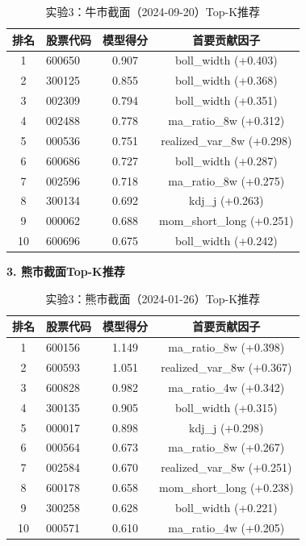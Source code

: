 \documentclass[11pt,a4paper]{ctexart}
\begin{document}
\begin{table}[htbp]
\centering
\caption{实验3：牛市截面（2024-09-20）Top-K推荐}
\label{tab:exp3-bull}
\begin{tabular}{clcc}
\toprule
\textbf{排名} & \textbf{股票代码} & \textbf{模型得分} & \textbf{首要贡献因子} \\
\midrule
1  & 600650 & 0.907 & boll\_width (+0.403) \\
2  & 300125 & 0.855 & boll\_width (+0.368) \\
3  & 002309 & 0.794 & boll\_width (+0.351) \\
4  & 002488 & 0.778 & ma\_ratio\_8w (+0.312) \\
5  & 000536 & 0.751 & realized\_var\_8w (+0.298) \\
6  & 600686 & 0.727 & boll\_width (+0.287) \\
7  & 002596 & 0.718 & ma\_ratio\_8w (+0.275) \\
8  & 300134 & 0.692 & kdj\_j (+0.263) \\
9  & 000062 & 0.688 & mom\_short\_long (+0.251) \\
10 & 600696 & 0.675 & boll\_width (+0.242) \\
\bottomrule
\end{tabular}
\end{table}

\textbf{3. 熊市截面Top-K推荐}

\begin{table}[htbp]
\centering
\caption{实验3：熊市截面（2024-01-26）Top-K推荐}
\label{tab:exp3-bear}
\begin{tabular}{clcc}
\toprule
\textbf{排名} & \textbf{股票代码} & \textbf{模型得分} & \textbf{首要贡献因子} \\
\midrule
1  & 600156 & 1.149 & ma\_ratio\_8w (+0.398) \\
2  & 600593 & 1.051 & realized\_var\_8w (+0.367) \\
3  & 600828 & 0.982 & ma\_ratio\_4w (+0.342) \\
4  & 300135 & 0.905 & boll\_width (+0.315) \\
5  & 000017 & 0.898 & kdj\_j (+0.298) \\
6  & 000564 & 0.673 & ma\_ratio\_8w (+0.267) \\
7  & 002584 & 0.670 & realized\_var\_8w (+0.251) \\
8  & 600178 & 0.658 & mom\_short\_long (+0.238) \\
9  & 300258 & 0.628 & boll\_width (+0.221) \\
10 & 000571 & 0.610 & ma\_ratio\_4w (+0.205) \\
\bottomrule
\end{tabular}
\end{table}
\end{document}
